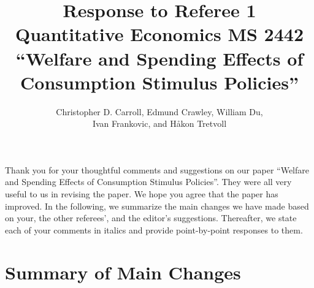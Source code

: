 \documentclass[12pt,letterpaper,english]{article}
\title{\textbf{Response to Referee 1\\ Quantitative Economics MS 2442 \\``Welfare and Spending Effects of \\ Consumption Stimulus Policies''}}
\author{Christopher D. Carroll, Edmund Crawley, William Du, \\ Ivan Frankovic, and H\aa kon Tretvoll}
\date{}
\begin{document}
	\onehalfspacing
	\maketitle
	
\noindent Thank you for your thoughtful comments and suggestions on our paper ``Welfare and Spending Effects of Consumption Stimulus Policies''. They were all very useful to us in revising the paper. We hope you agree that the paper has improved. In the following, we summarize the main changes we have made based on your, the other referees', and the editor's suggestions. Thereafter, we state each of your comments in italics and provide point-by-point responses to them.

\section{Summary of Main Changes}



\newpage 
\end{document}

